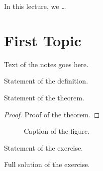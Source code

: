 %        

In this lecture, we \dots %

\section{First Topic}

Text of the notes goes here.

\begin{definition}
    Statement of the definition.
\end{definition}

\begin{theorem}\label{thm:example}
    Statement of the theorem.
\end{theorem}

\begin{proof}
    Proof of the theorem.
\end{proof}

\begin{figure}[ht]
    \centering
    \caption{Caption of the figure.}
    \label{fig:example}
\end{figure}

\begin{exercisebox}
\begin{exercise}
    Statement of the exercise.
\end{exercise}
\tcblower
\begin{wsolution}
    Full solution of the exercise.
\end{wsolution}
\end{exercisebox}

